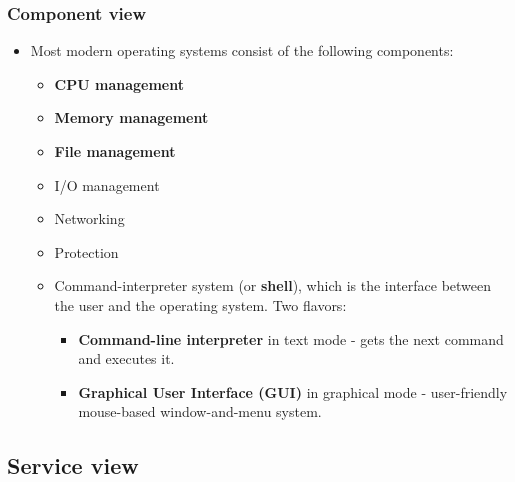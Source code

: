 \documentclass[CJKutf8,dvipsnames,table]{beamer}
\begin{document}
\begin{CJK*}{UTF8}{song}
  \begin{frame}
    \frametitle{Component view} \pause
    \begin{itemize}
    \item Most modern operating systems consist of the following components:  \pause
      \begin{itemize}
      \item \textbf{CPU management}  \pause
      \item \textbf{Memory management}  \pause
      \item \textbf{File management}  \pause
      \item I/O management  \pause
      \item Networking   \pause
      \item Protection  \pause
      \item Command-interpreter system (or \textbf{shell}), which is the interface between the user and the operating system. Two flavors:  \pause
        \begin{itemize}
        \item \textbf{Command-line interpreter} in text mode \pause - gets the next command and executes it.  \pause
        \item \textbf{Graphical User Interface (GUI)} in graphical mode \pause - user-friendly mouse-based window-and-menu system. 
        \end{itemize}
      \end{itemize}
    \end{itemize}
  \end{frame}

  \subsection{Service view}


\end{CJK*}
\end{document}
